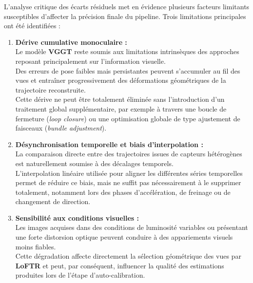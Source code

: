 \documentclass[12pt,a4paper,oneside]{report}
\begin{document}
\hspace*{.3cm}L'analyse critique des écarts résiduels met en évidence plusieurs facteurs limitants susceptibles d'affecter la précision finale du pipeline. Trois limitations principales ont été identifiées :

\begin{enumerate}[itemsep=0.5em]

    \item \textbf{Dérive cumulative monoculaire :}\\
    Le modèle \textbf{VGGT} reste soumis aux limitations intrinsèques des approches reposant principalement sur l'information visuelle. \\
Des erreurs de pose faibles mais persistantes peuvent s'accumuler au fil des vues et entraîner progressivement des déformations géométriques de la trajectoire reconstruite.\\
    Cette dérive ne peut être totalement éliminée sans l'introduction d'un traitement global supplémentaire, par exemple à travers une boucle de fermeture (\textit{loop closure}) ou une optimisation globale de type ajustement de faisceaux (\textit{bundle adjustment}).

    \item \textbf{Désynchronisation temporelle et biais d'interpolation :}\\
    La comparaison directe entre des trajectoires issues de capteurs hétérogènes est naturellement soumise à des décalages temporels.\\
    L'interpolation linéaire utilisée pour aligner les différentes séries temporelles permet de réduire ce biais, mais ne suffit pas nécessairement à le supprimer totalement, notamment lors des phases d'accélération, de freinage ou de changement de direction.

    \item \textbf{Sensibilité aux conditions visuelles :}\\
    Les images acquises dans des conditions de luminosité variables ou présentant une forte distorsion optique peuvent conduire à des appariements visuels moins fiables.\\
    Cette dégradation affecte directement la sélection géométrique des vues par \textbf{LoFTR} et peut, par conséquent, influencer la qualité des estimations produites lors de l'étape d'auto-calibration.

\end{enumerate}

\par\bigskip
\par\bigskip
\end{document}
